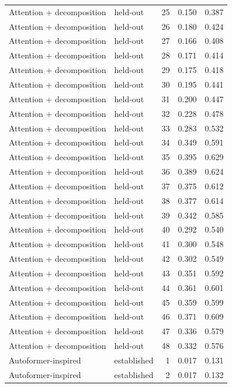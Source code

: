 \begin{tabular}{llrrr}
Attention + decomposition & held-out & 25 & 0.150 & 0.387 \\
Attention + decomposition & held-out & 26 & 0.180 & 0.424 \\
Attention + decomposition & held-out & 27 & 0.166 & 0.408 \\
Attention + decomposition & held-out & 28 & 0.171 & 0.414 \\
Attention + decomposition & held-out & 29 & 0.175 & 0.418 \\
Attention + decomposition & held-out & 30 & 0.195 & 0.441 \\
Attention + decomposition & held-out & 31 & 0.200 & 0.447 \\
Attention + decomposition & held-out & 32 & 0.228 & 0.478 \\
Attention + decomposition & held-out & 33 & 0.283 & 0.532 \\
Attention + decomposition & held-out & 34 & 0.349 & 0.591 \\
Attention + decomposition & held-out & 35 & 0.395 & 0.629 \\
Attention + decomposition & held-out & 36 & 0.389 & 0.624 \\
Attention + decomposition & held-out & 37 & 0.375 & 0.612 \\
Attention + decomposition & held-out & 38 & 0.377 & 0.614 \\
Attention + decomposition & held-out & 39 & 0.342 & 0.585 \\
Attention + decomposition & held-out & 40 & 0.292 & 0.540 \\
Attention + decomposition & held-out & 41 & 0.300 & 0.548 \\
Attention + decomposition & held-out & 42 & 0.302 & 0.549 \\
Attention + decomposition & held-out & 43 & 0.351 & 0.592 \\
Attention + decomposition & held-out & 44 & 0.361 & 0.601 \\
Attention + decomposition & held-out & 45 & 0.359 & 0.599 \\
Attention + decomposition & held-out & 46 & 0.371 & 0.609 \\
Attention + decomposition & held-out & 47 & 0.336 & 0.579 \\
Attention + decomposition & held-out & 48 & 0.332 & 0.576 \\
Autoformer-inspired & established & 1 & 0.017 & 0.131 \\
Autoformer-inspired & established & 2 & 0.017 & 0.132 \\

\end{tabular}
